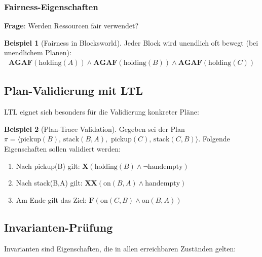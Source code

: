 ﻿\documentclass[a4paper,12pt]{article}
\theoremstyle{definition}
\newtheorem{beispiel}{Beispiel}[section]
\begin{document}
\subsubsection{Fairness-Eigenschaften}

\textbf{Frage}: Werden Ressourcen fair verwendet?

\begin{beispiel}[Fairness in Blocksworld]
	Jeder Block wird unendlich oft bewegt (bei unendlichem Planen):
	\begin{align}
	\mathbf{AG}\mathbf{AF}(\text{holding}(A)) \land \mathbf{AG}\mathbf{AF}(\text{holding}(B)) \land \mathbf{AG}\mathbf{AF}(\text{holding}(C))
	\end{align}
\end{beispiel}

\subsection{Plan-Validierung mit LTL}

LTL eignet sich besonders für die Validierung konkreter Pläne:

\begin{beispiel}[Plan-Trace Validation]
	Gegeben sei der Plan $\pi = \langle \text{pickup}(B),\, \text{stack}(B,A),$
	$\text{pickup}(C),\, \text{stack}(C,B) \rangle$.
	Folgende Eigenschaften sollen validiert werden:
	\begin{enumerate}
		\item Nach pickup(B) gilt: $\mathbf{X}(\text{holding}(B) \land \neg\text{handempty})$
		\item Nach stack(B,A) gilt: $\mathbf{X}\mathbf{X}(\text{on}(B,A) \land \text{handempty})$
		\item Am Ende gilt das Ziel: $\mathbf{F}(\text{on}(C,B) \land \text{on}(B,A))$
	\end{enumerate}
\end{beispiel}

\subsection{Invarianten-Prüfung}

Invarianten sind Eigenschaften, die in allen erreichbaren Zuständen gelten:
\end{document}
